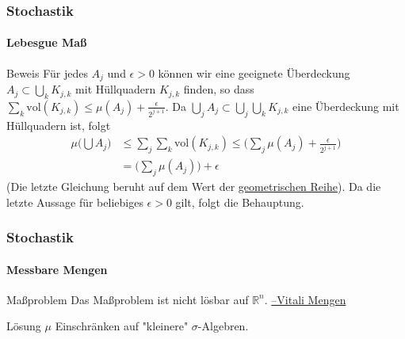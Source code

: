 \documentclass{beamer}
\begin{document}
\begin{frame}
    \frametitle{Stochastik}
\framesubtitle{Lebesgue Maß}
    \begin{block}{Beweis}
Für jedes $A_j$ und $\epsilon > 0$ können wir  eine geeignete Überdeckung  $A_j \subset \bigcup_k  K_{j,k}$ mit Hüllquadern $K_{j,k}$ finden, so dass 
 $\sum_k \text{vol} (K_{j,k}) \leq \mu(A_j) + \frac{\epsilon}{2^{j+1}}$.
Da $ \bigcup_j A_j \subset \bigcup_j \bigcup_k  K_{j,k}$ eine Überdeckung mit Hüllquadern ist, folgt
\begin{align*}
\mu \biggl (  \bigcup A_j  \biggr) & \leq \sum_j \sum_k \text{vol} (K_{j,k}) \leq  \bigl( \sum_j  \mu(A_j) + \frac{\epsilon}{2^{j+1}} \bigr)  \\
&= \bigl (\sum_j \mu(A_j) \bigr ) + \epsilon
\end{align*}
(Die letzte Gleichung beruht auf dem Wert der \href{https://de.wikipedia.org/wiki/Geometrische_Reihe}{geometrischen Reihe}).
Da die letzte Aussage für beliebiges $\epsilon > 0$ gilt, folgt die Behauptung.
\end{block}
 \end{frame}


\begin{frame}
    \frametitle{Stochastik}
\framesubtitle{Messbare Mengen}
    \begin{block}{Maßproblem}
Das Maßproblem ist nicht lösbar auf $\mathbb{R}^n$. 
\href{https://www.youtube.com/watch?v=SJ8YoV6YZFA}{--Vitali Mengen}
\end{block}

    \begin{block}{Lösung}
$\mu$ Einschränken auf "kleinere" $\sigma$-Algebren.
\end{block}

 \end{frame}
\end{document}
